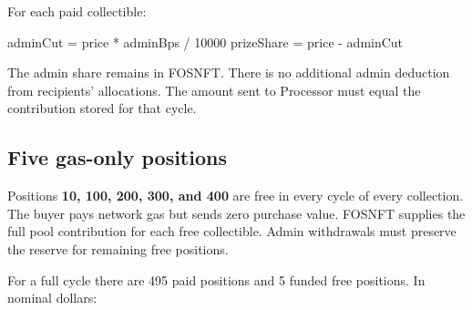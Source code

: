 \documentclass[
  10pt,
  letterpaper,
]{article}
\newenvironment{Shaded}{}{}
\newcommand{\NormalTok}[1]{#1}
\begin{document}
For each paid collectible:

\begin{Shaded}
\begin{Highlighting}[]
\NormalTok{adminCut = price * adminBps / 10000}
\NormalTok{prizeShare = price {-} adminCut}
\end{Highlighting}
\end{Shaded}

The admin share remains in FOSNFT. There is no additional admin
deduction from recipients' allocations. The amount sent to Processor
must equal the contribution stored for that cycle.

\subsection{Five gas-only positions}\label{five-gas-only-positions}

Positions \textbf{10, 100, 200, 300, and 400} are free in every cycle of
every collection. The buyer pays network gas but sends zero purchase
value. FOSNFT supplies the full pool contribution for each free
collectible. Admin withdrawals must preserve the reserve for remaining
free positions.

For a full cycle there are 495 paid positions and 5 funded free
positions. In nominal dollars:
\end{document}
